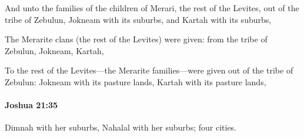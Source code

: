 			\begin{versebox}
					\item[BHS] 
					\item[ASV] And unto the families of the children of Merari, the rest of the Levites, out of the tribe of Zebulun, Jokneam with its suburbs, and Kartah with its suburbs,
					\item[NIV] The Merarite clans (the rest of the Levites) were given: from the tribe of Zebulun, Jokneam, Kartah,
					\item[NRSV] To the rest of the Levites—the Merarite families—were given out of the tribe of Zebulun: Jokneam with its pasture lands, Kartah with its pasture lands,
			\end{versebox}

		\paragraph{Joshua 21:35} %
			\label{JOSHUA-21-35}

			Dimnah with her suburbs, Nahalal with her suburbs; four cities.

